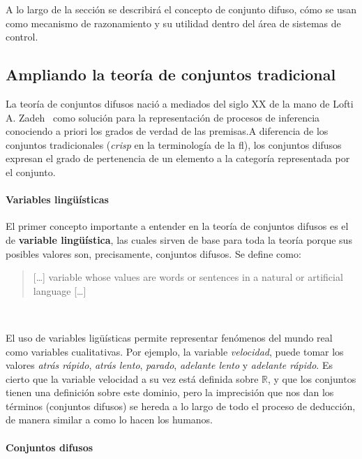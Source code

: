 A lo largo de la sección se describirá el concepto de conjunto difuso, cómo se usan como mecanismo de razonamiento y su utilidad dentro del área de sistemas de control.

\subsection{Ampliando la teoría de conjuntos tradicional}

La teoría de conjuntos difusos nació a mediados del siglo XX de la mano de Lofti A. Zadeh~\cite{lofti1965fuzzy} como solución para la representación de procesos de inferencia conociendo a priori los grados de verdad de las premisas.A diferencia de los conjuntos tradicionales (\textit{crisp} en la terminología de la \ac{fl}), los conjuntos difusos expresan el grado de pertenencia de un elemento a la categoría representada por el conjunto.

\paragraph{Variables lingüísticas}

El primer concepto importante a entender en la teoría de conjuntos difusos es el de \textbf{variable lingüística}, las cuales sirven de base para toda la teoría porque sus posibles valores son, precisamente, conjuntos difusos. Se define como:

\blockquote{[\ldots] variable whose values are words or sentences in a natural or artificial language [\ldots]}~\cite{zadeh1975concept}

El uso de variables ligüísticas permite representar fenómenos del mundo real como variables cualitativas. Por ejemplo, la variable \textit{velocidad}, puede tomar los valores \textit{atrás rápido}, \textit{atrás lento}, \textit{parado}, \textit{adelante lento} y \textit{adelante rápido}. Es cierto que la variable velocidad a su vez está definida sobre $\mathbb{R}$, y que los conjuntos tienen una definición sobre este dominio, pero la imprecisión que nos dan los términos (conjuntos difusos) se hereda a lo largo de todo el proceso de deducción, de manera similar a como lo hacen los humanos.

\paragraph{Conjuntos difusos}

